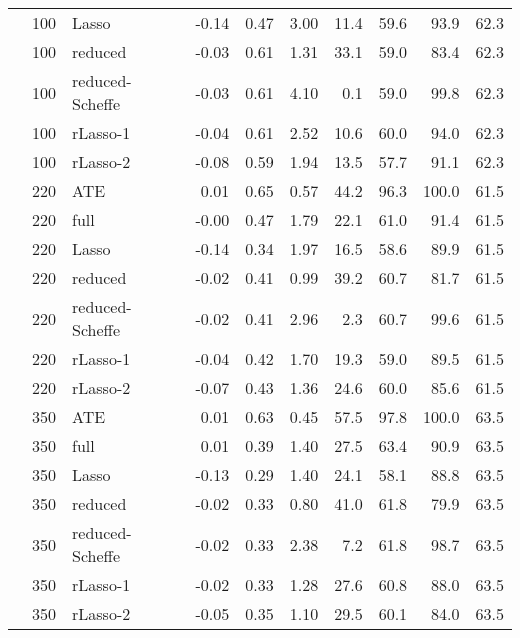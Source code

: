 \begin{table}
\begin{tabular}{lrlrrrrrrr}
   & 100 & Lasso & -0.14 & 0.47 & 3.00 & 11.4 & 59.6 & 93.9 & 62.3 \\ 
   & 100 & reduced & -0.03 & 0.61 & 1.31 & 33.1 & 59.0 & 83.4 & 62.3 \\ 
   & 100 & reduced-Scheffe & -0.03 & 0.61 & 4.10 & 0.1 & 59.0 & 99.8 & 62.3 \\ 
   & 100 & rLasso-1 & -0.04 & 0.61 & 2.52 & 10.6 & 60.0 & 94.0 & 62.3 \\ 
   & 100 & rLasso-2 & -0.08 & 0.59 & 1.94 & 13.5 & 57.7 & 91.1 & 62.3 \\ 
   \addrowspace  & 220 & ATE & 0.01 & 0.65 & 0.57 & 44.2 & 96.3 & 100.0 & 61.5 \\ 
   & 220 & full & -0.00 & 0.47 & 1.79 & 22.1 & 61.0 & 91.4 & 61.5 \\ 
   & 220 & Lasso & -0.14 & 0.34 & 1.97 & 16.5 & 58.6 & 89.9 & 61.5 \\ 
   & 220 & reduced & -0.02 & 0.41 & 0.99 & 39.2 & 60.7 & 81.7 & 61.5 \\ 
   & 220 & reduced-Scheffe & -0.02 & 0.41 & 2.96 & 2.3 & 60.7 & 99.6 & 61.5 \\ 
   & 220 & rLasso-1 & -0.04 & 0.42 & 1.70 & 19.3 & 59.0 & 89.5 & 61.5 \\ 
   & 220 & rLasso-2 & -0.07 & 0.43 & 1.36 & 24.6 & 60.0 & 85.6 & 61.5 \\ 
   \addrowspace  & 350 & ATE & 0.01 & 0.63 & 0.45 & 57.5 & 97.8 & 100.0 & 63.5 \\ 
   & 350 & full & 0.01 & 0.39 & 1.40 & 27.5 & 63.4 & 90.9 & 63.5 \\ 
   & 350 & Lasso & -0.13 & 0.29 & 1.40 & 24.1 & 58.1 & 88.8 & 63.5 \\ 
   & 350 & reduced & -0.02 & 0.33 & 0.80 & 41.0 & 61.8 & 79.9 & 63.5 \\ 
   & 350 & reduced-Scheffe & -0.02 & 0.33 & 2.38 & 7.2 & 61.8 & 98.7 & 63.5 \\ 
   & 350 & rLasso-1 & -0.02 & 0.33 & 1.28 & 27.6 & 60.8 & 88.0 & 63.5 \\ 
   & 350 & rLasso-2 & -0.05 & 0.35 & 1.10 & 29.5 & 60.1 & 84.0 & 63.5 \\ 
   \hline
\end{tabular}
\endgroup
\end{table}
